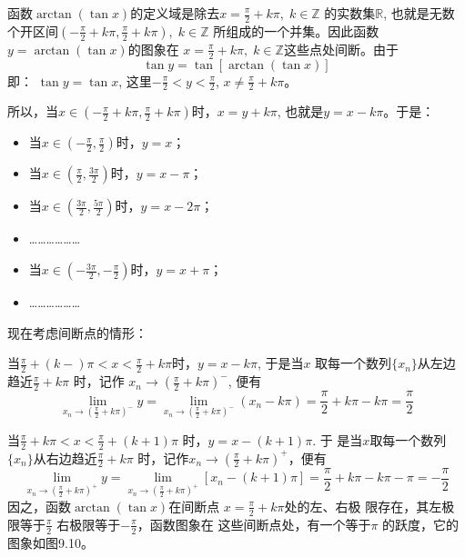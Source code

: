 \begin{solution}
函数$\arctan (\tan x)$的定义域是除去$x=\frac{\pi}{2}+k\pi,\; k\in\mathbb{Z}$
的实数集$\mathbb{R}$, 也就是无数个开区间$\left(-\frac{\pi}{2}+k\pi,\frac{\pi}{2}+k\pi\right),\; k\in\mathbb{Z}$
所组成的一个并集。因此函数$y=\arctan (\tan x)$的图象在
$x=\frac{\pi}{2}+k\pi,\; k\in\mathbb{Z}$这些点处间断。由于
\[\tan y=\tan[\arctan(\tan x)]\]
即：
$\tan y=\tan x$, 这里$-\frac{\pi}{2}<y<\frac{\pi}{2}$, $x\ne \frac{\pi}{2}+k\pi$。

所以，当$x\in\left(-\frac{\pi}{2}+k\pi,\frac{\pi}{2}+k\pi\right)$时，$x=y+k\pi$, 也就是$y=x-k\pi$。于是：
\begin{itemize}
    \item 当$x\in\left(-\frac{\pi}{2},\frac{\pi}{2}\right)$时，$y=x$；
    \item 当$x\in\left(\frac{\pi}{2},\frac{3\pi}{2}\right)$时，$y=x-\pi$；
    \item 当$x\in\left(\frac{3\pi}{2},\frac{5\pi}{2}\right)$时，$y=x-2\pi$；
    \item ………………
    \item 当$x\in\left(-\frac{3\pi}{2},-\frac{\pi}{2}\right)$时，$y=x+\pi$；
    \item ………………
\end{itemize}
现在考虑间断点的情形：

当$\frac{\pi}{2}+(k-)\pi<x<\frac{\pi}{2}+k\pi$时，$y=x-k\pi$, 于是当$x$
取每一个数列$\{x_n\}$从左边趋近$\frac{\pi}{2}+k\pi$ 时，记作
$x_n\to \left(\frac{\pi}{2}+k\pi \right)^-$, 
便有
\[\lim_{x_n\to \left(\tfrac{\pi}{2}+k\pi \right)^-}y=\lim_{x_n\to \left(\tfrac{\pi}{2}+k\pi \right)^-}(x_n-k\pi)=\frac{\pi}{2}+k\pi-k\pi=\frac{\pi}{2}\]

当$\frac{\pi}{2}+k\pi <x<\frac{\pi}{2}+(k+1)\pi$ 时，$y=x-(k+1)\pi$. 于
是当$x$取每一个数列$\{x_n\}$从右边趋近$\frac{\pi}{2}+k\pi$ 时，记作$x_n\to \left(\frac{\pi}{2}+k\pi\right)^+$，便有
\[\lim_{x_n\to \left(\tfrac{\pi}{2}+k\pi \right)^+}y=\lim_{x_n\to \left(\tfrac{\pi}{2}+k\pi \right)^+}[x_n-(k+1)\pi]=\frac{\pi}{2}+k\pi-k\pi-\pi=-\frac{\pi}{2}\]
因之，函数$\arctan(\tan x)$在间断点
$x=\frac{\pi}{2}+k\pi$处的左、右极
限存在，其左极限等于$\frac{\pi}{2}$
右极限等于$-\frac{\pi}{2}$，函数图象在
这些间断点处，有一个等于$\pi$ 的跃度，它的图象如图9.10。

\begin{figure}[htp]
    \centering
{}
    \caption{}
\end{figure}
\end{solution}

